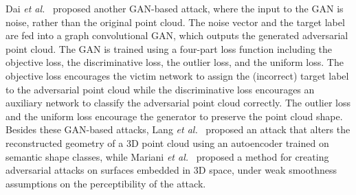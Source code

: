 \documentclass{ieeeaccess}
\def\etal{\textit{et al.}}
\begin{document}
Dai \etal~\cite{dai2021generating} proposed another GAN-based attack, where the input to the GAN is noise, %
rather than the original point cloud. The noise vector and the target label are fed into a graph convolutional GAN, which outputs the generated adversarial point cloud. The GAN is trained using a %
four-part loss function including the objective loss, the discriminative loss, the outlier loss, and the uniform loss. %
The objective loss encourages the victim network to assign the (incorrect) target label to the adversarial point cloud while the discriminative loss encourages an auxiliary network to classify the adversarial point cloud correctly. The outlier loss and the uniform loss %
encourage the generator to preserve the point cloud shape.
Besides these GAN-based attacks, Lang \etal~\cite{lang2021geometric} proposed an attack that alters the reconstructed geometry of a 3D point cloud %
using an autoencoder trained on semantic shape classes, while Mariani \etal~\cite{mariani2020generating} proposed a method for creating adversarial attacks on surfaces embedded in 3D space, under weak smoothness assumptions on the perceptibility of the attack. 


\end{document}
